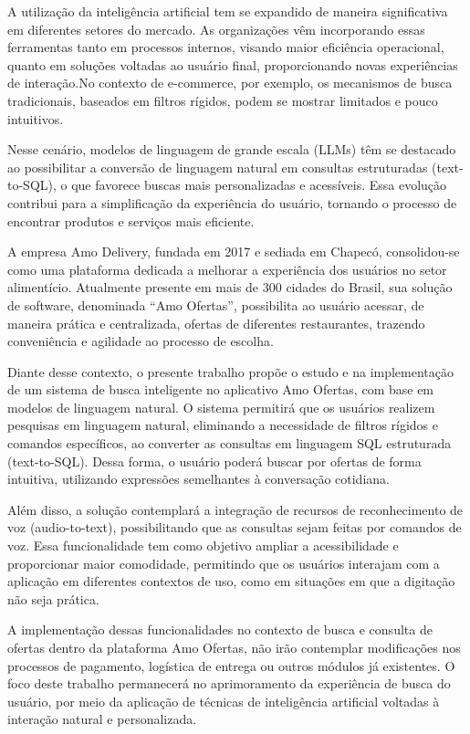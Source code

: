 \label{cap:introducao}

A utilização da inteligência artificial tem se expandido de maneira significativa em diferentes setores do mercado. As organizações vêm incorporando essas ferramentas tanto em processos internos, 
visando maior eficiência operacional, quanto em soluções voltadas ao usuário final, proporcionando novas experiências de interação.No contexto de e-commerce, por exemplo, os mecanismos de busca tradicionais, 
baseados em filtros rígidos, podem se mostrar limitados e pouco intuitivos.

Nesse cenário, modelos de linguagem de grande escala (LLMs) têm se destacado ao possibilitar a conversão de linguagem natural em consultas estruturadas (text-to-SQL), 
o que favorece buscas mais personalizadas e acessíveis. Essa evolução contribui para a simplificação da experiência do usuário, tornando o processo de encontrar produtos e serviços mais eficiente. 

A empresa Amo Delivery, fundada em 2017 e sediada em Chapecó, consolidou-se como uma plataforma dedicada a melhorar a experiência dos usuários no setor alimentício. 
Atualmente presente em mais de 300 cidades do Brasil, sua solução de software, denominada “Amo Ofertas”, possibilita ao usuário acessar, de maneira prática e centralizada, 
ofertas de diferentes restaurantes, trazendo conveniência e agilidade ao processo de escolha.

Diante desse contexto, o presente trabalho propõe o estudo e na implementação de um sistema de busca inteligente no aplicativo Amo Ofertas, com base em modelos de linguagem natural. 
O sistema permitirá que os usuários realizem pesquisas em linguagem natural, eliminando a necessidade de filtros rígidos e comandos específicos, ao converter as consultas em 
linguagem SQL estruturada (text-to-SQL). Dessa forma, o usuário poderá buscar por ofertas de forma intuitiva, utilizando expressões semelhantes à conversação cotidiana.

Além disso, a solução contemplará a integração de recursos de reconhecimento de voz (audio-to-text), possibilitando que as consultas sejam feitas por comandos de voz. Essa funcionalidade
tem como objetivo ampliar a acessibilidade e proporcionar maior comodidade, permitindo que os usuários interajam com a aplicação em diferentes contextos de uso, como em 
situações em que a digitação não seja prática.

A implementação dessas funcionalidades no contexto de busca e consulta de ofertas dentro da plataforma Amo Ofertas, 
não irão contemplar modificações nos processos de pagamento, logística de entrega ou outros módulos já existentes. O foco deste trabalho 
permanecerá no aprimoramento da experiência de busca do usuário, por meio da aplicação de técnicas de 
inteligência artificial voltadas à interação natural e personalizada.


